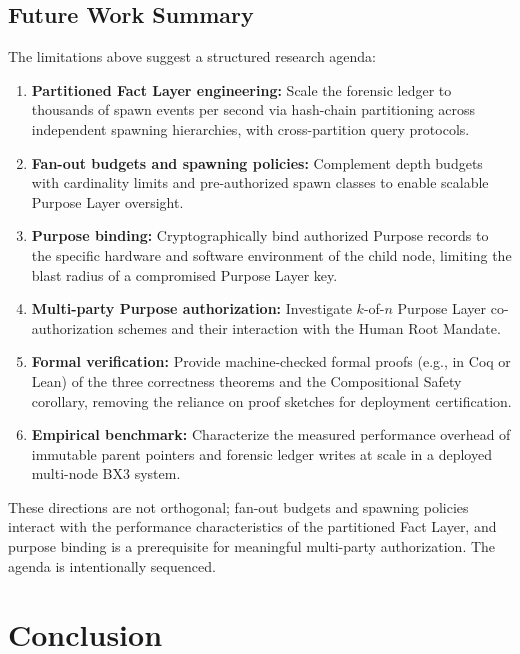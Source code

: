 \subsection{Future Work Summary}
\label{sec:limitations-future-summary}

The limitations above suggest a structured research agenda:

\begin{enumerate}
    \itemsep0em
    \item \textbf{Partitioned Fact Layer engineering:} Scale the forensic ledger to thousands of spawn events per second via hash-chain partitioning across independent spawning hierarchies, with cross-partition query protocols.
    \item \textbf{Fan-out budgets and spawning policies:} Complement depth budgets with cardinality limits and pre-authorized spawn classes to enable scalable Purpose Layer oversight.
    \item \textbf{Purpose binding:} Cryptographically bind authorized Purpose records to the specific hardware and software environment of the child node, limiting the blast radius of a compromised Purpose Layer key.
    \item \textbf{Multi-party Purpose authorization:} Investigate $k$-of-$n$ Purpose Layer co-authorization schemes and their interaction with the Human Root Mandate.
    \item \textbf{Formal verification:} Provide machine-checked formal proofs (e.g., in Coq or Lean) of the three correctness theorems and the Compositional Safety corollary, removing the reliance on proof sketches for deployment certification.
    \item \textbf{Empirical benchmark:} Characterize the measured performance overhead of immutable parent pointers and forensic ledger writes at scale in a deployed multi-node BX3 system.
\end{enumerate}

These directions are not orthogonal; fan-out budgets and spawning policies interact with the performance characteristics of the partitioned Fact Layer, and purpose binding is a prerequisite for meaningful multi-party authorization. The agenda is intentionally sequenced.

\section{Conclusion}
\label{sec:conclusion}

